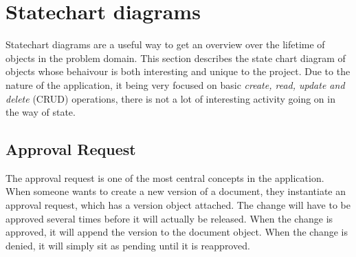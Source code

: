 \section{Statechart diagrams}
Statechart diagrams are a useful way to get an overview over the lifetime of objects in the problem domain.
This section describes the state chart diagram of objects whose behaivour is both interesting and unique to the project.
Due to the nature of the application, it being very focused on basic \textit{create, read, update and delete} (CRUD) operations, there is not a lot of interesting activity going on in the way of state.

\subsection{Approval Request}
The approval request is one of the most central concepts in the application.
When someone wants to create a new version of a document, they instantiate an approval request, which has a version object attached.
The change will have to be approved several times before it will actually be released.
When the change is approved, it will append the version to the document object. When the change is denied, it will simply sit as pending until it is reapproved.



